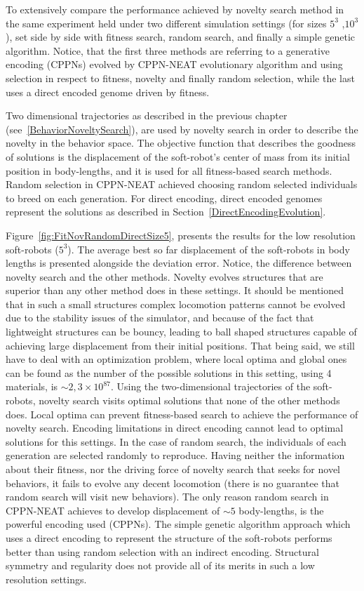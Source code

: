 To extensively compare the performance achieved by novelty search method in the same experiment held under two different simulation settings (for sizes $5^3$ ,$10^3$), set side by side with fitness search, random search, and finally a simple genetic algorithm. Notice, that the first three methods are referring to a generative encoding (CPPNs) evolved by CPPN-NEAT evolutionary algorithm and using selection in respect to fitness, novelty and finally random selection, while the last uses a direct encoded genome driven by fitness. 

Two dimensional trajectories as described in the previous chapter (see~\ref{BehaviorNoveltySearch}), are used by novelty search in order to describe the novelty in the behavior space. The objective function that describes the goodness of solutions is the displacement of the soft-robot's center of mass from its initial position in body-lengths, and it is used for all fitness-based search methods. Random selection in CPPN-NEAT achieved choosing random selected individuals to breed on each generation. For direct encoding, direct encoded genomes represent the solutions as described in Section~\ref{DirectEncodingEvolution}.

Figure~\ref{fig:FitNovRandomDirectSize5}, presents the results for the low resolution soft-robots ($5^3$). The average best so far displacement of the soft-robots in body lengths is presented alongside the deviation error. Notice, the difference between novelty search and the other methods. Novelty evolves structures that are superior than any other method does in these settings. It should be mentioned that in such a small structures complex locomotion patterns cannot be evolved due to the stability issues of the simulator, and because of the fact that lightweight structures can be bouncy, leading to ball shaped structures capable of achieving large displacement from their initial positions. That being said, we still have to deal with an optimization problem, where local optima and global ones can be found as the number of the possible solutions in this setting, using 4 materials, is $\sim 2,3 \times 10^{87}$. Using the two-dimensional trajectories of the soft-robots, novelty search visits optimal solutions that none of the other methods does. Local optima can prevent fitness-based search to achieve the performance of novelty search. Encoding limitations in direct encoding cannot lead to optimal solutions for this settings. In the case of random search, the individuals of each generation are selected randomly to reproduce. Having neither the information about their fitness, nor the driving force of novelty search that seeks for novel behaviors, it fails to evolve any decent locomotion (there is no guarantee that random search will visit new behaviors). The only reason random search in CPPN-NEAT achieves to develop displacement of $\sim 5$ body-lengths, is the powerful encoding used (CPPNs). The simple genetic algorithm approach which uses a direct encoding to represent the structure of the soft-robots performs better than using random selection with an indirect encoding. Structural symmetry and regularity does not provide all of its merits in such a low resolution settings.

